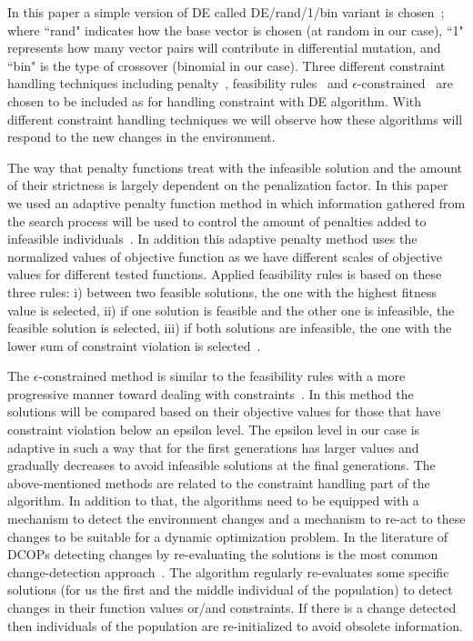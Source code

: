 \documentclass[conference]{IEEEtran}
\begin{document}
In this paper a simple version of DE called DE/rand/1/bin variant is chosen~\cite{Mezura10a}; where ``rand" indicates how the base vector is chosen (at random in our case), ``1" represents  how many vector pairs will contribute in differential mutation, and ``bin" is the type of crossover (binomial in our case). 
Three different constraint handling techniques including penalty~\cite{tessema2009adaptive}, feasibility rules~\cite{deb2000efficient} and $\epsilon$-constrained~\cite{takahama2005constrained} are chosen to be included as for handling constraint with DE algorithm. With different constraint handling techniques we will observe how these algorithms will respond to the new changes in the environment.

The way that penalty functions treat with the infeasible solution and the amount of their strictness is largely dependent on the penalization factor. In this paper we used an adaptive penalty function method in which information gathered from the search process will be used to control the amount of penalties added to infeasible individuals~\cite{tessema2009adaptive}. In addition this adaptive penalty method uses the normalized values of objective function as we have different scales of objective values for different tested functions.
Applied feasibility rules is based on these three rules: i) between two feasible solutions, the one with the highest fitness 
value is selected, ii) if one solution is feasible and the other one is infeasible, the 
feasible solution is selected, iii) if both solutions are infeasible, the one with the lower sum of constraint violation is selected~\cite{deb2000efficient}.

The $\epsilon$-constrained method is similar to the feasibility rules with a more progressive manner toward dealing with constraints~\cite{takahama2005constrained}. In this method the solutions will be compared based on their objective values for those that have constraint violation below an epsilon level. The epsilon level in our case is adaptive in such a way that for the first generations has larger values and gradually decreases to avoid infeasible solutions at the final generations.
The above-mentioned methods are related to the constraint handling part of the algorithm. In addition to that, the algorithms need to be equipped with a mechanism to detect the environment changes and a mechanism to re-act to these changes to be suitable for a dynamic optimization problem.
In the literature of DCOPs detecting changes by re-evaluating the solutions is the most common change-detection approach~\cite{Nguyen20121}. The algorithm regularly re-evaluates some specific solutions (for us the first and the middle individual of the population) to detect changes in their function values or/and constraints. 
If there is a change detected then individuals of the population are re-initialized to avoid obsolete information.
\end{document}
